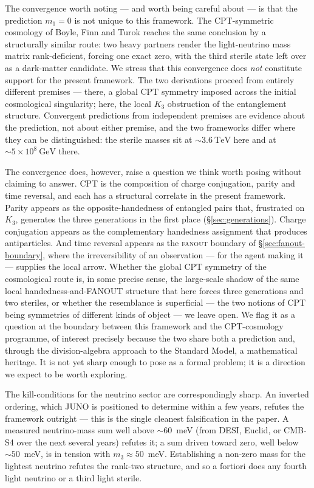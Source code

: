 The convergence worth noting --- and worth being careful about --- is that the prediction
$m_1 = 0$ is not unique to this framework. The CPT-symmetric cosmology of Boyle, Finn and Turok
\autocite{boylefinnturok2018cpt,boylefinnturok2022bigbang} reaches the same conclusion by a
structurally similar route: two heavy partners render the light-neutrino mass matrix rank-deficient,
forcing one exact zero, with the third sterile state left over as a dark-matter candidate. We stress
that this convergence does \emph{not} constitute support for the present framework. The two
derivations proceed from entirely different premises --- there, a global CPT symmetry imposed across
the initial cosmological singularity; here, the local $K_3$ obstruction of the entanglement
structure. Convergent predictions from independent premises are evidence about the prediction, not
about either premise, and the two frameworks differ where they can be distinguished: the sterile
masses sit at $\sim 3.6\ \mathrm{TeV}$ here and at $\sim 5\times10^{8}\ \mathrm{GeV}$ there.

The convergence does, however, raise a question we think worth posing without claiming to answer.
CPT is the composition of charge conjugation, parity and time reversal, and each has a structural
correlate in the present framework. Parity appears as the opposite-handedness of entangled pairs
that, frustrated on $K_3$, generates the three generations in the first place
(\S\ref{sec:generations}). Charge conjugation appears as the complementary handedness assignment
that produces antiparticles. And time reversal appears as the \textsc{fanout} boundary of
\S\ref{sec:fanout-boundary}, where the irreversibility of an observation --- for the agent making it
--- supplies the local arrow. Whether the global CPT symmetry of the cosmological route is, in some
precise sense, the large-scale shadow of the same local handedness-and-FANOUT structure that here
forces three generations and two steriles, or whether the resemblance is superficial --- the two
notions of CPT being symmetries of different kinds of object --- we leave open. We flag it as a
question at the boundary between this framework and the CPT-cosmology programme, of interest
precisely because the two share both a prediction and, through the division-algebra approach to the
Standard Model, a mathematical heritage. It is not yet sharp enough to pose as a formal problem; it
is a direction we expect to be worth exploring.

The kill-conditions for the neutrino sector are correspondingly sharp. An inverted ordering, which
JUNO is positioned to determine within a few years, refutes the framework outright --- this is the
single cleanest falsification in the paper. A measured neutrino-mass sum well above $\sim 60$~meV
(from DESI, Euclid, or CMB-S4 over the next several years) refutes it; a sum driven toward zero, well
below $\sim 50$~meV, is in tension with $m_3 \approx 50$~meV. Establishing a non-zero mass for the
lightest neutrino refutes the rank-two structure, and so a fortiori does any fourth light neutrino or
a third light sterile.

